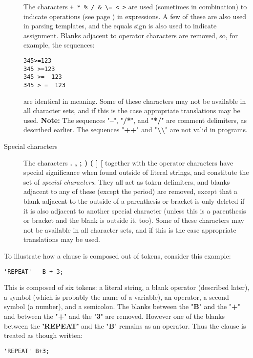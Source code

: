 \begin{description}
The characters \texttt{+ \textendash \-  * \% \textbar / \& \textbackslash = < >}
are used (sometimes in combination) to indicate
 operations (see page \pageref{refops})  in expressions.
A few of these are also used in parsing templates, and the equals sign
is also used to indicate assignment.
Blanks adjacent to operator characters are removed, so, for example,
the sequences:
\begin{lstlisting}
345>=123
345 >=123
345 >=  123
345 > =  123
\end{lstlisting}
are identical in meaning.
 Some of these characters may not be available in all character sets,
and if this is the case appropriate translations may be used.
\textbf{Note: }The sequences "\textbf{--}", "\textbf{/*}", and
"\textbf{*/}" are comment delimiters, as described earlier.
The sequences "\textbf{++}"
and "\textbf{\textbackslash \textbackslash }" are not valid in \nr{}
programs.
\item[Special characters]\label{refspecs}

The characters  \textbf{.  ,  ;  )  (  ]  [}  together
with the operator characters have special significance when found
outside of literal strings, and constitute the set of \emph{special
characters}.
They all act as token delimiters, and blanks adjacent to any of these
(except the period) are removed, except that a blank adjacent to the
outside of a parenthesis or bracket is only deleted if it is also
adjacent to another special character (unless this is a parenthesis or
bracket and the blank is outside it, too).
 Some of these characters may not be available in all character sets,
and if this is the case appropriate translations may be used.
\end{description}
 To illustrate how a clause is composed out of tokens, consider this
example:
\begin{lstlisting}
'REPEAT'   B + 3;
\end{lstlisting}
This is composed of six tokens: a literal string, a blank operator
(described later), a symbol (which is probably the name of a variable),
an operator, a second symbol (a number), and a semicolon.
The blanks between the "\textbf{B}" and the "\textbf{+}"
and between the "\textbf{+}" and the "\textbf{3}" are
removed.
However one of the blanks between the \textbf{'REPEAT'} and the
"\textbf{B}" remains as an operator.
Thus the clause is treated as though written:
\begin{lstlisting}
'REPEAT' B+3;
\end{lstlisting}
